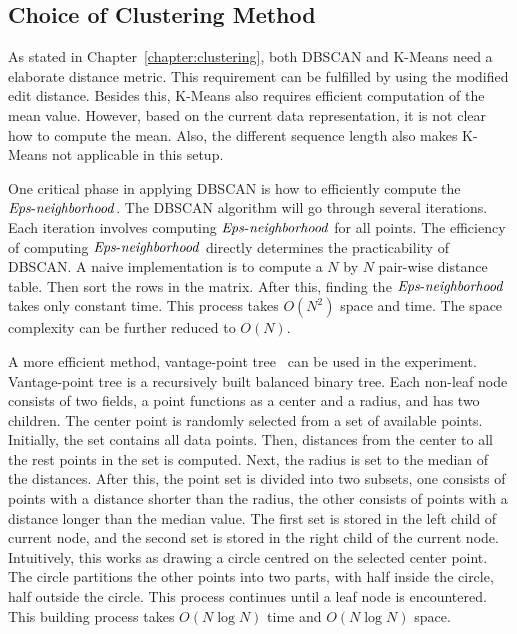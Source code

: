 \subsection{Choice of Clustering Method}
As stated in Chapter~\ref{chapter:clustering}, both DBSCAN and K-Means need a elaborate distance metric. This requirement can be fulfilled by using the modified edit distance. Besides this, K-Means also requires efficient computation of the mean value. However, based on the current data representation, it is not clear how to compute the mean. Also, the different sequence length also makes K-Means not applicable in this setup. 

One critical phase in applying DBSCAN is how to efficiently compute the $\id{Eps-neighborhood}$.  The DBSCAN algorithm will go through several iterations. Each iteration involves computing $\id{Eps-neighborhood}$ for all points. The efficiency of computing $\id{Eps-neighborhood}$ directly determines the practicability of DBSCAN. A naive implementation is to compute a $N$ by $N$ pair-wise distance table. Then sort the rows in the matrix. After this, finding the $\id{Eps-neighborhood}$ takes only constant time. This process takes $O(N^2)$ space and time. The space complexity can be further reduced to $O(N)$.

A more efficient method, vantage-point tree~\cite{yianilos1993data} can be used in the experiment. Vantage-point tree is a recursively built balanced binary tree. Each non-leaf node consists of two fields, a point functions as a center and a radius, and has two children. The center point is randomly selected from a set of available points. Initially, the set contains all data points. Then, distances from the center to all the rest points in the set is computed. Next, the radius is set to the median of the distances. After this, the point set is divided into two subsets, one consists of points with a distance shorter than the radius, the other consists of points with a distance longer than the median value. The first set is stored in the left child of current node, and the second set is stored in the right child of the current node. Intuitively, this works as drawing a circle centred on the selected center point. The circle partitions the other points into two parts, with half inside the circle, half outside the circle. This process continues until a leaf node is encountered. This building process takes $O(N \log N)$ time and $O(N \log N)$ space. 

